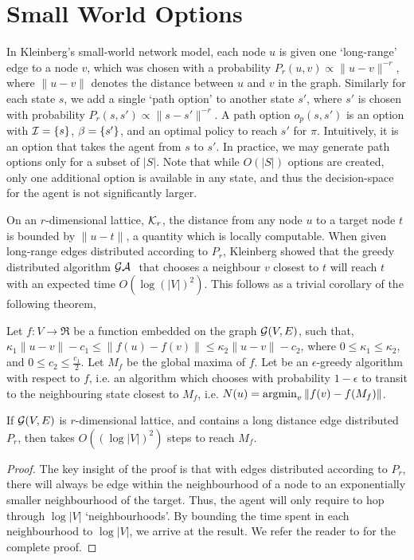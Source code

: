 \section{Small World Options}
\label{sec:theory}

In Kleinberg's small-world network model, each node $u$ is given one
`long-range' edge to a node $v$, which was chosen with a probability
$P_r(u,v) \propto \|u-v\|^{-r}$, where $\|u-v\|$ denotes the distance
between $u$ and $v$ in the graph. Similarly for each state $s$, we add
a single `path option' to another state $s'$, where $s'$ is chosen with
probability $P_r(s,s') \propto \|s-s'\|^{-r}$. A path option $o_p(s,s')$
is an option with $\mathcal{I} = \{s\}$, $\beta = \{s'\}$, and an
optimal policy to reach $s'$ for $\pi$. Intuitively, it is an option
that takes the agent from $s$ to $s'$. In practice, we may generate path
options only for a subset of $|S|$. Note that while $O(|S|)$ options are
created, only one additional option is available in any state, and thus
the decision-space for the agent is not significantly larger.

On an $r$-dimensional lattice, $\mathcal{K}_r$, the distance from any node
$u$ to a target node $t$ is bounded by $\|u-t\|$, a quantity which is
locally computable. When given long-range edges distributed according to
$P_r$, Kleinberg showed that the greedy distributed algorithm
$\mathcal{GA}~$ that chooses a neighbour $v$ closest to $t$ will reach $t$
with an expected time $O(\log(|V|)^2)$. This follows as a trivial
corollary of the following theorem,

\begin{theorem}
    \label{thm:small-world}
    Let $f : V \to \Re$ be a function embedded on the graph
    $\mathcal{G}(V,E)$, such that, $\kappa_1 \|u-v\| - c_1 \le \|f(u)
    - f(v)\| \le \kappa_2 \|u - v\| - c_2$, where $0 \le \kappa_1 \le
    \kappa_2$, and $0 \le c_2 \le \frac{c_1}{2}$. Let $M_f$ be the
    global maxima of $f$. Let \egreedyalgo be an $\epsilon$-greedy
    algorithm with respect to $f$, i.e.  an algorithm which chooses with
    probability $1-\epsilon$ to transit to the neighbouring state
    closest to $M_f$, i.e. $N(u) = \operatorname{argmin}_v \|f(v) - f(M_f)\|$.
    
    If $\mathcal{G}(V,E)$ is $r$-dimensional lattice, and contains a long
    distance edge distributed $P_r$, then \egreedyalgo takes $O( (\log
    |V|)^2 )$ steps to reach $M_f$.
\end{theorem}
\begin{proof}
  The key insight of the proof is that with edges distributed according
  to $P_r$, there will always be edge within the neighbourhood of a node
  to an exponentially smaller neighbourhood of the target. Thus, the
  agent will only require to hop through $\log |V|$ `neighbourhoods'. By
  bounding the time spent in each neighbourhood to $\log |V|$, we arrive
  at the result. We refer the reader to
   for the complete proof.
\end{proof}

